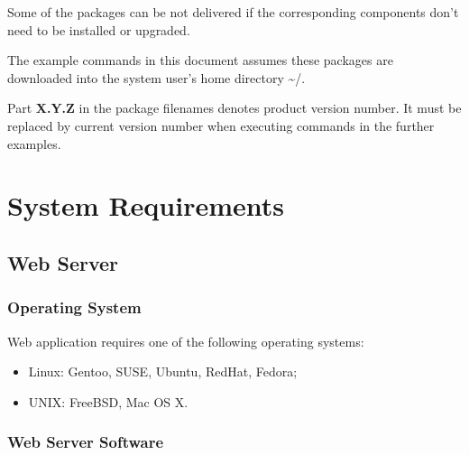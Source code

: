 \documentclass[12pt]{article}
\newcommand{\vigReleasePath}{\textasciitilde/}
\begin{document}
Some of the packages can be not delivered if the corresponding components don't need to be installed or upgraded.

The example commands in this document assumes these packages are downloaded into the system user's home directory \textsf{{\vigReleasePath}}.

Part \textbf{X.Y.Z} in the package filenames denotes product version number. It must be replaced by current version number when executing commands in the further examples.

\section{System Requirements}

\subsection{Web Server}

\subsubsection{Operating System}
Web application requires one of the following operating systems:
\begin{itemize}
	\item Linux: Gentoo, SUSE, Ubuntu, RedHat, Fedora;
	\item UNIX: FreeBSD, Mac OS X.
\end{itemize}

\subsubsection{Web Server Software}
\end{document}
